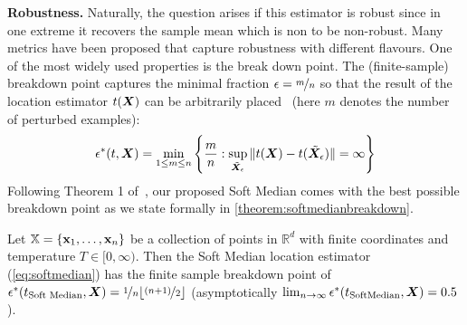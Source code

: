\documentclass[sigconf,authordraft]{acmart}
\newcommand{\features}{\mX}
\newcommand{\featset}{\sX}
\newcommand{\pertm}{\tilde{\mX}_\epsilon}
\begin{document}
\textbf{Robustness.} Naturally, the question arises if this estimator is robust since in one extreme it recovers the sample mean which is non to be non-robust. Many metrics have been proposed that capture robustness with different flavours. One of the most widely used properties is the break down point. The (finite-sample) breakdown point captures the minimal fraction \(\epsilon = \nicefrac{m}{n}\) so that the result of the location estimator \(t(\features)\) can be arbitrarily placed~\citep{Donoho1983} (here \(m\) denotes the number of perturbed examples):
%
\begin{equation}\label{eq:breakdown}
  \epsilon^*(t, \features) = \min_{1 \le m \le n} \left \{ \frac{m}{n}: \sup_{\pertm} \|t(\features)-t(\pertm)\| = \infty \right \}
\end{equation}
%
Following Theorem 1 of~\citet{Geisler2020}, our proposed Soft Median comes with the best possible breakdown point as we state formally in \autoref{theorem:softmedianbreakdown}.

\begin{theorem}\label{theorem:softmedianbreakdown}
  Let \(\featset = \{ \mathbf{\mathbf{x}}_1, \dots, \mathbf{\mathbf{x}}_n\} \) be a collection of points in \(\mathbb{R}^d\) with finite coordinates and temperature \(T \in [0, \infty) \). Then the Soft Median location estimator (\autoref{eq:softmedian}) has the finite sample breakdown point of \(\epsilon^*(t_{\text{Soft Median}}, \features) = \nicefrac{1}{n} \lfloor \nicefrac{(n+1)}{2}\rfloor \) (asymptotically \( \lim_{n \to \infty} \epsilon^*(t_{\text{SoftMedian}}, \features) = 0.5 \)).
\end{theorem}
\end{document}
